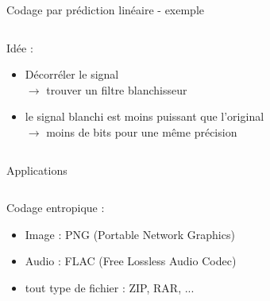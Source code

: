 \documentclass[9pt, aspectratio=169]{beamer}
\begin{document}
\begin{frame}{Codage par prédiction linéaire - exemple} %


\begin{columns}
   \begin{column}{0.2\textwidth}
	
        \tiny Idée :
        \begin{itemize}
            \item Décorréler le signal\\
            $\rightarrow$ trouver un filtre \og blanchisseur \fg{}
            \item le signal \og blanchi \fg{} est moins puissant que l'original \\
            $\rightarrow$ moins de bits pour une même précision
        \end{itemize}
        
   \end{column}
   \begin{column}{0.8\textwidth}

   \end{column}
\end{columns}


\end{frame}

\begin{frame}{Applications} %
\begin{columns}
   \begin{column}{0.6\textwidth}
		Codage entropique :
        \begin{itemize}
            \item Image : PNG (Portable Network Graphics)
            \item Audio : FLAC (Free Lossless Audio Codec)
            \item tout type de fichier : ZIP, RAR, ...
        \end{itemize}
        
   \end{column}
   \begin{column}{0.39\textwidth}
		
   \end{column}
\end{columns}
\end{frame}
\end{document}
